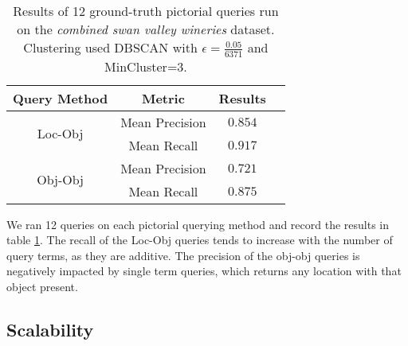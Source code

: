 \small{
\begin{table}[h!]
    \begin{center}
        \begin{tabular}{ |c|c|c|c| } 
            \hline
            Query Method & Metric & Results \\
            \hline
            \multirow{2}{7em}{Loc-Obj} & Mean Precision & $0.854$ \\
            & Mean Recall & $0.917$\\%
            \hline     
            \multirow{2}{7em}{Obj-Obj} & Mean Precision & $0.721$ \\ 
            &Mean Recall & $0.875$ \\
            \hline
        \end{tabular}
        \caption{Results of 12 ground-truth pictorial queries run on the \textit{combined swan valley wineries} dataset. Clustering used DBSCAN with $\epsilon = \frac{0.05}{6371}$ and MinCluster=$3$.} 
        \label{Table:GroundTruth}
    \end{center}
\end{table}
}
We ran 12 queries on each pictorial querying method and record the results in table \ref{Table:GroundTruth}. 
The recall of the Loc-Obj queries tends to increase with the number of query terms, as they are additive. 
The precision of the obj-obj queries is negatively impacted by single term queries, which returns any location with that object present.

\subsection{Scalability}

